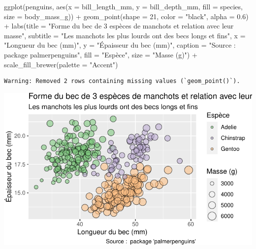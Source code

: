 \documentclass[
  a4paper,
  DIV=11,
  numbers=noendperiod,
  oneside]{scrreprt}
\newenvironment{Shaded}{}{}
\newcommand{\AttributeTok}[1]{\textcolor[rgb]{0.84,0.23,0.29}{#1}}
\newcommand{\DecValTok}[1]{\textcolor[rgb]{0.00,0.36,0.77}{#1}}
\newcommand{\FloatTok}[1]{\textcolor[rgb]{0.00,0.36,0.77}{#1}}
\newcommand{\FunctionTok}[1]{\textcolor[rgb]{0.44,0.26,0.76}{#1}}
\newcommand{\NormalTok}[1]{\textcolor[rgb]{0.14,0.16,0.18}{#1}}
\newcommand{\SpecialCharTok}[1]{\textcolor[rgb]{0.00,0.36,0.77}{#1}}
\newcommand{\StringTok}[1]{\textcolor[rgb]{0.01,0.18,0.38}{#1}}
\begin{document}
\begin{Shaded}
\begin{Highlighting}[]
\FunctionTok{ggplot}\NormalTok{(penguins, }\FunctionTok{aes}\NormalTok{(}\AttributeTok{x =}\NormalTok{ bill\_length\_mm, }\AttributeTok{y =}\NormalTok{ bill\_depth\_mm,}
                     \AttributeTok{fill =}\NormalTok{ species, }\AttributeTok{size =}\NormalTok{ body\_mass\_g)) }\SpecialCharTok{+}
  \FunctionTok{geom\_point}\NormalTok{(}\AttributeTok{shape =} \DecValTok{21}\NormalTok{, }\AttributeTok{color =} \StringTok{"black"}\NormalTok{, }\AttributeTok{alpha =} \FloatTok{0.6}\NormalTok{) }\SpecialCharTok{+}
  \FunctionTok{labs}\NormalTok{(}\AttributeTok{title =} \StringTok{"Forme du bec de 3 espèces de manchots et relation avec leur masse"}\NormalTok{,}
       \AttributeTok{subtitle =} \StringTok{"Les manchots les plus lourds ont des becs longs et fins"}\NormalTok{,}
       \AttributeTok{x =} \StringTok{"Longueur du bec (mm)"}\NormalTok{,}
       \AttributeTok{y =} \StringTok{"Épaisseur du bec (mm)"}\NormalTok{,}
       \AttributeTok{caption =} \StringTok{"Source :  package \textquotesingle{}palmerpenguins\textquotesingle{}"}\NormalTok{,}
       \AttributeTok{fill =} \StringTok{"Espèce"}\NormalTok{,}
       \AttributeTok{size =} \StringTok{"Masse (g)"}\NormalTok{) }\SpecialCharTok{+}
  \FunctionTok{scale\_fill\_brewer}\NormalTok{(}\AttributeTok{palette =} \StringTok{"Accent"}\NormalTok{)}
\end{Highlighting}
\end{Shaded}

\begin{verbatim}
Warning: Removed 2 rows containing missing values (`geom_point()`).
\end{verbatim}

\includegraphics{03-visualization_files/figure-pdf/unnamed-chunk-100-1.pdf}
\end{document}
